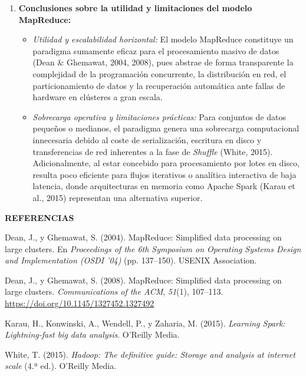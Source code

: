 \documentclass[12pt,a4paper]{article}
\newcommand{\llav}{\symbol{60}\symbol{60}}
\newcommand{\rlav}{\symbol{62}\symbol{62}}
\newcommand{\marcadornospace}[1]{\llav#1\rlav}
\newcommand{\seccionref}{%
  \vspace{0.6cm}%
  {\centering\bfseries\fontsize{12pt}{14pt}\selectfont\marcadornospace{REFERENCIAS}\par}%
  \vspace{0.35cm}%
}
\renewenvironment{thebibliography}[1]{%
  \seccionref
  \begin{list}{}{%
    \setlength{\leftmargin}{1.27cm}%
    \setlength{\itemindent}{-1.27cm}%
    \setlength{\itemsep}{0.75em}%
    \setlength{\parsep}{0pt}%
  }%
  \sloppy
}{%
  \end{list}
}
\begin{document}
\begin{enumerate}
    \item \textbf{Conclusiones sobre la utilidad y limitaciones del modelo MapReduce:}
    \begin{itemize}
        \item \textit{Utilidad y escalabilidad horizontal:} El modelo MapReduce constituye un paradigma sumamente eficaz para el procesamiento masivo de datos (Dean \& Ghemawat, 2004, 2008), pues abstrae de forma transparente la complejidad de la programación concurrente, la distribución en red, el particionamiento de datos y la recuperación automática ante fallas de hardware en clústeres a gran escala.
        \item \textit{Sobrecarga operativa y limitaciones prácticas:} Para conjuntos de datos pequeños o medianos, el paradigma genera una sobrecarga computacional innecesaria debido al coste de serialización, escritura en disco y transferencias de red inherentes a la fase de \textit{Shuffle} (White, 2015). Adicionalmente, al estar concebido para procesamiento por lotes en disco, resulta poco eficiente para flujos iterativos o analítica interactiva de baja latencia, donde arquitecturas en memoria como Apache Spark (Karau et al., 2015) representan una alternativa superior.
    \end{itemize}
\end{enumerate}

\clearpage

\begin{thebibliography}{99}

\item Dean, J., y Ghemawat, S. (2004). MapReduce: Simplified data processing on large clusters. En \textit{Proceedings of the 6th Symposium on Operating Systems Design and Implementation (OSDI '04)} (pp. 137--150). USENIX Association.

\item Dean, J., y Ghemawat, S. (2008). MapReduce: Simplified data processing on large clusters. \textit{Communications of the ACM}, \textit{51}(1), 107--113. \url{https://doi.org/10.1145/1327452.1327492}

\item Karau, H., Konwinski, A., Wendell, P., y Zaharia, M. (2015). \textit{Learning Spark: Lightning-fast big data analysis}. O'Reilly Media.

\item White, T. (2015). \textit{Hadoop: The definitive guide: Storage and analysis at internet scale} (4.ª ed.). O'Reilly Media.

\end{thebibliography}
\end{document}
